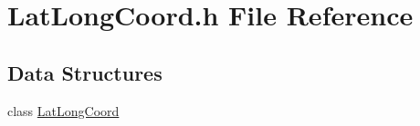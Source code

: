 \hypertarget{a00024}{\section{Lat\-Long\-Coord.\-h File Reference}
\label{a00024}
}
\subsection*{Data Structures}
\begin{DoxyCompactItemize}
\item 
class \hyperlink{a00006}{Lat\-Long\-Coord}
\end{DoxyCompactItemize}

